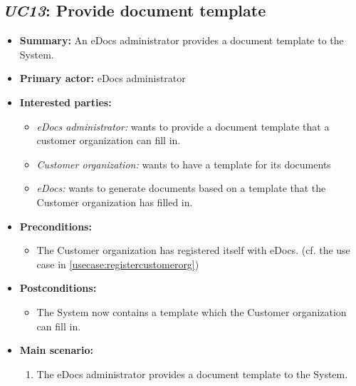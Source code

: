 \documentclass[a4paper,10pt]{article}
\begin{document}
\subsection{\emph{UC13}: Provide document template}
\begin{itemize}
	\item \textbf{Summary:} An eDocs administrator provides a document template to the System.
    \item \textbf{Primary actor:} eDocs administrator
    \item \textbf{Interested parties:} 
        \begin{itemize}
        	\item \textit{eDocs administrator:} wants to provide a document template that a customer organization can fill in.
            \item \textit{Customer organization:} wants to have a template for its documents
            \item \textit{eDocs:} wants to generate documents based on a template that the Customer organization has filled in.
        \end{itemize}

    \item \textbf{Preconditions:}
        \begin{itemize}
            \item The Customer organization has registered itself with eDocs. (cf. the use case in \ref{usecase:registercustomerorg})
        \end{itemize}

    \item \textbf{Postconditions:}
        \begin{itemize}
            \item The System now contains a template which the Customer organization can fill in.
        \end{itemize}
        
    \item \textbf{Main scenario:} 
    \begin{enumerate}
		\item The eDocs administrator provides a document template to the System.
    \end{enumerate}
\end{itemize}
\end{document}
